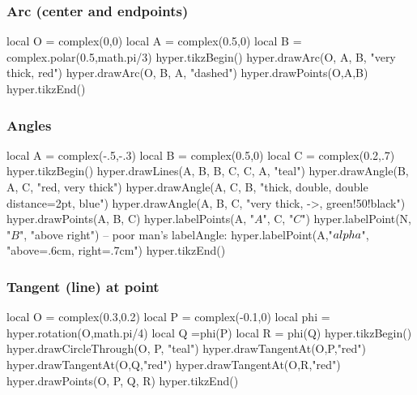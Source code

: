 \documentclass{article}
\begin{document}
\subsubsection{Arc (center and endpoints)}
\begin{codeandresult}
\begin{luacode*}
local O = complex(0,0)
local A = complex(0.5,0)
local B = complex.polar(0.5,math.pi/3)
hyper.tikzBegin()
hyper.drawArc(O, A, B, "very thick, red")
hyper.drawArc(O, B, A, "dashed")
hyper.drawPoints(O,A,B)
hyper.tikzEnd()
\end{luacode*}
\end{codeandresult}

\subsubsection{Angles}
\begin{codeandresult}
\begin{luacode*}
local A = complex(-.5,-.3)
local B = complex(0.5,0)
local C = complex(0.2,.7)
hyper.tikzBegin()
hyper.drawLines(A, B, B, C, C, A, "teal")
hyper.drawAngle(B, A, C, "red, very thick")
hyper.drawAngle(A, C, B, "thick, double, double distance=2pt, blue")
hyper.drawAngle(A, B, C, "very thick, ->, green!50!black")
hyper.drawPoints(A, B, C)
hyper.labelPoints(A, "$A$", C, "$C$")
hyper.labelPoint(N, "$B$", "above right")
-- poor man's labelAngle:
hyper.labelPoint(A,"$\\alpha$", "above=.6cm, right=.7cm")
hyper.tikzEnd()
\end{luacode*}
\end{codeandresult}

\subsubsection{Tangent (line) at point}
\begin{codeandresult}
\begin{luacode*}
local O = complex(0.3,0.2)
local P = complex(-0.1,0)
local phi  =  hyper.rotation(O,math.pi/4)
local Q =phi(P)
local R = phi(Q)
hyper.tikzBegin()
hyper.drawCircleThrough(O, P, "teal")
hyper.drawTangentAt(O,P,"red")
hyper.drawTangentAt(O,Q,"red")
hyper.drawTangentAt(O,R,"red")
hyper.drawPoints(O, P, Q, R)
hyper.tikzEnd()
\end{luacode*}
\end{codeandresult}

\end{document}
